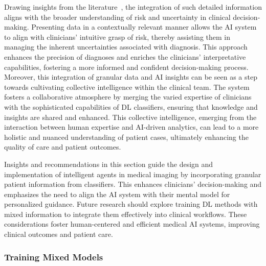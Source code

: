 \vspace{2.50mm}

\textcolor{revised}{Drawing insights from the literature~\cite{10.1145/3313831.3376506}, the integration of such detailed information aligns with the broader understanding of risk and uncertainty in clinical decision-making.
Presenting data in a contextually relevant manner allows the \ac{AI} system to align with clinicians' intuitive grasp of risk, thereby assisting them in managing the inherent uncertainties associated with diagnosis.
This approach enhances the precision of diagnoses and enriches the clinicians' interpretative capabilities, fostering a more informed and confident decision-making process.
Moreover, this integration of granular data and \ac{AI} insights can be seen as a step towards cultivating collective intelligence within the clinical team.
The system fosters a collaborative atmosphere by merging the varied expertise of clinicians with the sophisticated capabilities of \ac{DL} classifiers, ensuring that knowledge and insights are shared and enhanced.
This collective intelligence, emerging from the interaction between human expertise and \acs{AI}-driven analytics, can lead to a more holistic and nuanced understanding of patient cases, ultimately enhancing the quality of care and patient outcomes.}

Insights and recommendations in this section guide the design and implementation of intelligent agents in medical imaging by incorporating granular patient information from classifiers.
This enhances clinicians' decision-making and emphasizes the need to align the \ac{AI} system with their mental model for personalized guidance.
Future research should explore training \ac{DL} methods with mixed information to integrate them effectively into clinical workflows.
These considerations foster human-centered and efficient medical \ac{AI} systems, improving clinical outcomes and patient care.

\subsubsection{Training Mixed Models}
\label{sec:app005008001002}

